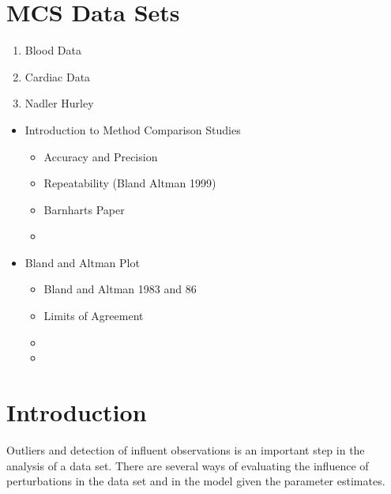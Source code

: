 \documentclass[12pt, a4paper]{report}
\theoremstyle{plain}
\theoremstyle{definition}
\theoremstyle{remark}
\begin{document}
\section{MCS Data Sets}
\begin{enumerate}
	\item Blood Data
	\item Cardiac Data
	\item Nadler Hurley 
\end{enumerate}

\begin{itemize}		
	
	\item	Introduction to Method Comparison Studies	
	\begin{itemize}	
		\item	Accuracy and Precision
		\item	Repeatability (Bland Altman 1999)
		\item	Barnharts Paper
		\item	
	\end{itemize}	
	
	
	\item	Bland and Altman Plot	
	\begin{itemize}	
		\item	Bland and Altman 1983 and 86
		\item	Limits of Agreement
		\item	
		\item	
	\end{itemize}
	
	
\end{itemize}		


\section{Introduction}

Outliers and detection of influent observations is an important step in the analysis of a data set. There are several ways of evaluating the influence of perturbations in the data set and in the model given the parameter estimates. 
\end{document}
